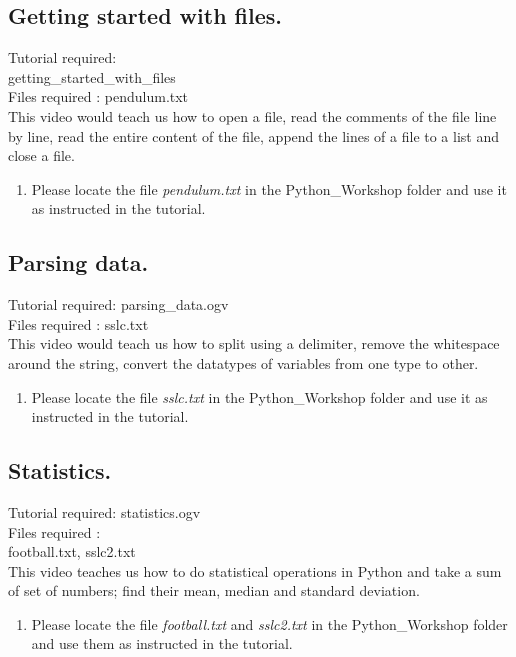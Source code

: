 \documentclass[11pt,twocolumn]{article}
\newenvironment{enumcpt}{\begin{enumerate} \topsep 0pt \partopsep 0pt 
                        \parsep 0pt
                        \itemsep 0pt \leftmargin -1in \rightmargin 0pt
                        }{\end{enumerate}}
\begin{document}
\subsection{Getting started with files.}
Tutorial required: \\getting\_started\_with\_files \\
Files required : pendulum.txt \\
This video would teach us how to open a file, read the comments of the file line by line, read the entire content of the file, append the lines of a file to a list and close a file.
\begin{enumcpt}
\item Please locate the file \emph{pendulum.txt} in the Python\_Workshop folder and use it
      as instructed in the tutorial. 
\end{enumcpt}

\subsection{Parsing data.}
Tutorial required: parsing\_data.ogv \\
Files required : sslc.txt \\
This video would teach us how to split using a delimiter, remove the whitespace around the string, convert the datatypes  of variables from one type to other. 
\begin{enumcpt}
\item Please locate the file \emph{sslc.txt} in the Python\_Workshop folder and use it
      as instructed in the tutorial. 
\end{enumcpt}

\subsection{Statistics.}
Tutorial required: statistics.ogv \\
Files required :\\ football.txt, sslc2.txt \\
This video teaches us how to do statistical operations in Python and take a sum of set of numbers; find their mean, median and standard deviation. \\
\begin{enumcpt}
\item Please locate the file \emph{football.txt} and \emph{sslc2.txt} in the Python\_Workshop folder and use them
      as instructed in the tutorial. 
\end{enumcpt}
\end{document}

